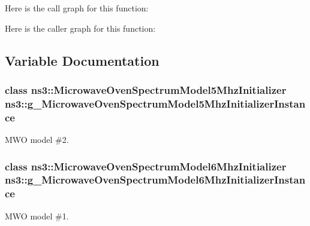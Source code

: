Here is the call graph for this function\+:




Here is the caller graph for this function\+:




\subsection{Variable Documentation}
\subsubsection[{\texorpdfstring{g\+\_\+\+Microwave\+Oven\+Spectrum\+Model5\+Mhz\+Initializer\+Instance}{g_MicrowaveOvenSpectrumModel5MhzInitializerInstance}}]{\setlength{\rightskip}{0pt plus 5cm}class {\bf ns3\+::\+Microwave\+Oven\+Spectrum\+Model5\+Mhz\+Initializer}  ns3\+::g\+\_\+\+Microwave\+Oven\+Spectrum\+Model5\+Mhz\+Initializer\+Instance\hspace{0.3cm}{\ttfamily [static]}}\hypertarget{group__spectrum_ga5073cbf9e00712117f2d24d81740a34c}{}\label{group__spectrum_ga5073cbf9e00712117f2d24d81740a34c}


M\+WO model \#2. 

\subsubsection[{\texorpdfstring{g\+\_\+\+Microwave\+Oven\+Spectrum\+Model6\+Mhz\+Initializer\+Instance}{g_MicrowaveOvenSpectrumModel6MhzInitializerInstance}}]{\setlength{\rightskip}{0pt plus 5cm}class {\bf ns3\+::\+Microwave\+Oven\+Spectrum\+Model6\+Mhz\+Initializer}  ns3\+::g\+\_\+\+Microwave\+Oven\+Spectrum\+Model6\+Mhz\+Initializer\+Instance\hspace{0.3cm}{\ttfamily [static]}}\hypertarget{group__spectrum_gaca1a04ae288bb360e6c5974c1161dd08}{}\label{group__spectrum_gaca1a04ae288bb360e6c5974c1161dd08}


M\+WO model \#1. 

